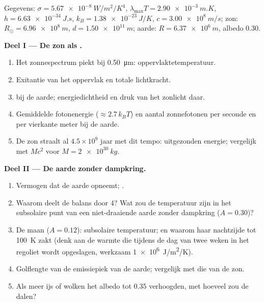 \begin{problem}\label{pb:b2:thermal-radiation:1}
Gegevens: $\sigma = \qty{5.67e-8}{W/m^2/K^4}$,
$\lambda_{\max}T = \qty{2.90e-3}{m.K}$,
$h = \qty{6.63e-34}{J.s}$, $k_B = \qty{1.38e-23}{J/K}$, $c = \qty{3.00e8}{m/s}$;
zon: $R_\odot = \qty{6.96e8}{m}$, $d = \qty{1.50e11}{m}$; aarde:
$R =
\qty{6.37e6}{m}$, albedo $0.30$.

\textbf{Deel I --- De zon als .}
\begin{enumerate}
  \item Het zonnespectrum piekt bij \qty{0.50}{\micro m}: oppervlakte\-temperatuur.
  \item Exitantie van het oppervlak en totale lichtkracht.
  \item {} bij de aarde; energiedichtheid en druk van
        het zonlicht daar.
  \item Gemiddelde fotonenergie ($\approx 2.7\,k_BT$) en aantal zonnefotonen
        per seconde en per vierkante meter bij de aarde.
  \item De zon straalt al $4.5 \times 10^9$ jaar met dit tempo:
        uitgezonden energie; vergelijk met $Mc^2$ voor $M = \qty{2e30}{kg}$.
\end{enumerate}

\textbf{Deel II --- De aarde zonder dampkring.}
\begin{enumerate}[resume]
  \item Vermogen dat de aarde opneemt; .
  \item Waarom deelt de balans door $4$? Wat zou de
        temperatuur zijn in het subsolaire punt van een niet-draaiende aarde zonder
        dampkring ($A = 0.30$)?
  \item De maan ($A = 0.12$): subsolaire temperatuur; en waarom haar nachtzijde
        tot \qty{100}{K} zakt (denk aan de warmte die tijdens de dag van
        twee weken in het regoliet wordt opgeslagen, werkzaam \qty{1e6}{J/m^2/K}).
  \item Golflengte van de emissiepiek van de aarde; vergelijk met die
        van de zon.
  \item Als meer ijs of wolken het albedo tot $0.35$ verhoogden, met hoeveel
        zou de  dalen?
\end{enumerate}


\end{problem}
